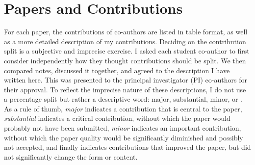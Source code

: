 \section{Papers and Contributions}
For each paper, the contributions of co-authors are listed in table format, as well as a more detailed description of my contributions. Deciding on the contribution split is a subjective and imprecise exercise. I asked each student co-author to first consider independently how they thought contributions should be split. We then compared notes, discussed it together, and agreed to the description I have written here. This was presented to the principal investigator (PI) co-authors for their approval. To reflect the imprecise nature of these descriptions, I do not use a percentage split but rather a descriptive word: major, substantial, minor, or \negligible. As a rule of thumb, \emph{major} indicates a contribution that is central to the paper, \emph{substantial} indicates a critical contribution, without which the paper would probably not have been submitted, \emph{minor} indicates an important contribution, without which the paper quality would be significantly diminished and possibly not accepted, and finally \emph{\negligible} indicates contributions that improved the paper, but did not significantly change the form or content.

